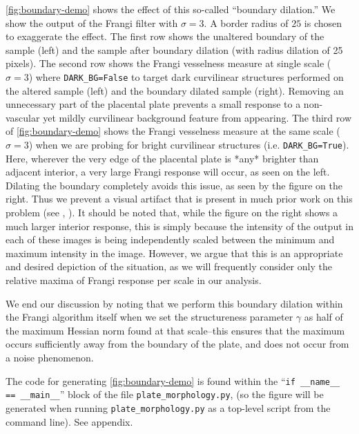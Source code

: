     \cref{fig:boundary-demo} shows the effect of this so-called ``boundary dilation.'' 
    We show the output of the Frangi filter with $\sigma=3$. A border radius of $25$ is chosen to exaggerate the effect.
    The first row shows the unaltered boundary of the sample (left) and
        the sample after boundary dilation (with radius dilation of 25 pixels).
    The second row shows the Frangi vesselness measure at single scale ($\sigma=3$) where \texttt{DARK\_BG=False} to target dark curvilinear structures performed on the altered sample (left) and the boundary dilated sample (right). Removing an unnecessary part of
    the placental plate prevents a small response to a non-vascular yet mildly curvilinear
    background feature from appearing.
    The third row of \cref{fig:boundary-demo} shows the Frangi vesselness measure at the same scale ($\sigma=3$) when we are probing for bright curvilinear structures (i.e.
    \texttt{DARK\_BG=True}). Here, wherever the very edge of the placental plate is *any* brighter than adjacent interior, a very large Frangi response will occur, as seen on the left. Dilating the boundary completely avoids this issue, as seen by the figure on the right. Thus we prevent a visual artifact that is present in much prior work on this problem (see \cite{huynh2013filter}, \cite{almoussa-ucla-reu}).
    It should be noted that, while the figure on the right shows a much larger interior response, this is simply because the intensity of the output in each of these
    images is being independently scaled between the minimum and maximum intensity in the image. However, we argue that this is an appropriate and desired depiction of the situation, as we will frequently consider only the relative maxima of Frangi response per scale in our analysis.
    
    We end our discussion by noting that we perform this boundary dilation within the
    Frangi algorithm itself when we set the structureness parameter $\gamma$ as half of the maximum Hessian norm found at that scale--this ensures that the maximum occurs sufficiently away from the boundary of the plate, and does not occur from a noise phenomenon.
    
    The code for generating \cref{fig:boundary-demo} is found within the ``\texttt{if \_\_name\_\_ == \_\_main\_\_}'' block of the file \texttt{plate\_morphology.py},
    (so the figure will be generated when running \texttt{plate\_morphology.py} as a top-level script from the command line). See appendix.
    
